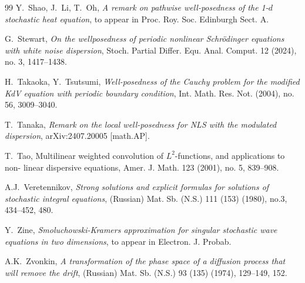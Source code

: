 \documentclass[letterpaper, 11pt,  reqno]{amsart}
\newcommand{\1}{\hspace{0.5mm}\text{I}\hspace{0.5mm}}
\numberwithin{equation}{section}
\numberwithin{theorem}{section}
\begin{document}
\begin{thebibliography}{99}
Y.~Shao, J.~Li,  T.~Oh, 
{\it 
A remark on pathwise well-posedness of 
the 1-$d$ stochastic heat equation}, 
to appear
in Proc. Roy. Soc. Edinburgh Sect. A.




G.~Stewart, 
{\it On the wellposedness of periodic nonlinear Schr\"odinger equations with white noise dispersion}, 
Stoch. Partial Differ. Equ. Anal. Comput. 12 (2024), no. 3, 1417--1438.



H.~Takaoka, Y.~Tsutsumi, 
{\it Well-posedness of the Cauchy problem for the modified KdV equation with periodic boundary condition},
 Int. Math. Res. Not. (2004), no. 56, 3009--3040. 


T.~Tanaka, 
{\it Remark on the local well-posedness for NLS with the modulated dispersion}, 
arXiv:2407.20005 [math.AP].


T.~Tao, 
{Multilinear weighted convolution of $L^2$-functions, and applications to non-
linear dispersive equations}, Amer. J. Math. 123 (2001), no. 5, 839--908.








A.J.~Veretennikov,
{\it Strong solutions and explicit formulas for solutions of stochastic integral equations},
(Russian) Mat. Sb. (N.S.) 111 (153) (1980), no.3, 434--452, 480.





Y.~Zine, 
{\it Smoluchowski-Kramers approximation for singular stochastic wave equations in two dimensions},
to appear in Electron. J. Probab.



A.K.~Zvonkin, 
{\it A transformation of the phase space of a diffusion process that will remove the drift}, 
(Russian)
Mat. Sb. (N.S.) 93 (135) (1974), 129--149, 152. 





\end{thebibliography}
\end{document}
